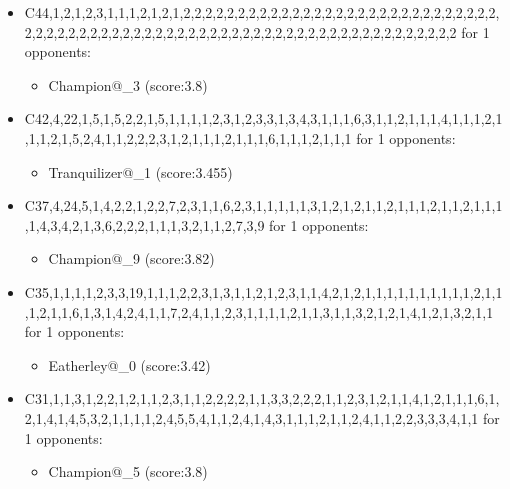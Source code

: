 \begin{appendices}
\begin{itemize}
        \item C44,1,2,1,2,3,1,1,1,2,1,2,1,2,2,2,2,2,2,2,2,2,2,2,2,2,2,2,2,2,2,2,2,2,2,2,2,2,2,2,2,2,2,2,2,2,2,2,2,2,2,2,2,2,2,2,2,2,2,2,2,2,2,2,2,2,2,2,2,2,2,2,2,2,2,2,2,2,2,2,2,2 for 1 opponents:
        \begin{multicols}{3}
            \begin{itemize}
                \item Champion@\_3 (score:3.8)
            \end{itemize}
        \end{multicols}

        \item C42,4,22,1,5,1,5,2,2,1,5,1,1,1,1,2,3,1,2,3,3,1,3,4,3,1,1,1,6,3,1,1,2,1,1,1,4,1,1,1,2,1,1,1,2,1,5,2,4,1,1,2,2,2,3,1,2,1,1,1,2,1,1,1,6,1,1,1,2,1,1,1 for 1 opponents:
        \begin{multicols}{3}
            \begin{itemize}
                \item Tranquilizer@\_1 (score:3.455)
            \end{itemize}
        \end{multicols}

        \item C37,4,24,5,1,4,2,2,1,2,2,7,2,3,1,1,6,2,3,1,1,1,1,1,3,1,2,1,2,1,1,2,1,1,1,2,1,1,2,1,1,1,1,4,3,4,2,1,3,6,2,2,2,1,1,1,3,2,1,1,2,7,3,9 for 1 opponents:
        \begin{multicols}{3}
            \begin{itemize}
                \item Champion@\_9 (score:3.82)
            \end{itemize}
        \end{multicols}

        \item C35,1,1,1,1,2,3,3,19,1,1,1,2,2,3,1,3,1,1,2,1,2,3,1,1,4,2,1,2,1,1,1,1,1,1,1,1,1,1,2,1,1,1,2,1,1,6,1,3,1,4,2,4,1,1,7,2,4,1,1,2,3,1,1,1,1,2,1,1,3,1,1,3,2,1,2,1,4,1,2,1,3,2,1,1 for 1 opponents:
        \begin{multicols}{3}
            \begin{itemize}
                \item Eatherley@\_0 (score:3.42)
            \end{itemize}
        \end{multicols}

        \item C31,1,1,3,1,2,2,1,2,1,1,2,3,1,1,2,2,2,2,1,1,3,3,2,2,2,1,1,2,3,1,2,1,1,4,1,2,1,1,1,6,1,2,1,4,1,4,5,3,2,1,1,1,1,2,4,5,5,4,1,1,2,4,1,4,3,1,1,1,2,1,1,2,4,1,1,2,2,3,3,3,4,1,1 for 1 opponents:
        \begin{multicols}{3}
            \begin{itemize}
                \item Champion@\_5 (score:3.8)
            \end{itemize}
        \end{multicols}


\end{itemize}
\end{appendices}
